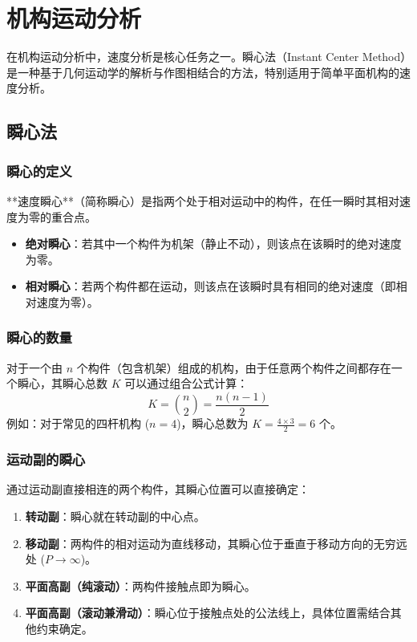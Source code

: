 \chapter{机构运动分析}
	
	在机构运动分析中，速度分析是核心任务之一。瞬心法（Instant Center Method）是一种基于几何运动学的解析与作图相结合的方法，特别适用于简单平面机构的速度分析。
	
	\section{瞬心法}
	
	\subsection{瞬心的定义}
	**速度瞬心**（简称瞬心）是指两个处于相对运动中的构件，在任一瞬时其相对速度为零的重合点。
	\begin{itemize}
		\item \textbf{绝对瞬心}：若其中一个构件为机架（静止不动），则该点在该瞬时的绝对速度为零。
		\item \textbf{相对瞬心}：若两个构件都在运动，则该点在该瞬时具有相同的绝对速度（即相对速度为零）。
	\end{itemize}
	
	\subsection{瞬心的数量}
	对于一个由 $n$ 个构件（包含机架）组成的机构，由于任意两个构件之间都存在一个瞬心，其瞬心总数 $K$ 可以通过组合公式计算：
	\begin{equation}
		K = \binom{n}{2} = \frac{n(n-1)}{2}
	\end{equation}
	例如：对于常见的四杆机构 ($n=4$)，瞬心总数为 $K = \frac{4 \times 3}{2} = 6$ 个。
	
	\subsection{运动副的瞬心}
	通过运动副直接相连的两个构件，其瞬心位置可以直接确定：
	\begin{enumerate}
		\item \textbf{转动副}：瞬心就在转动副的中心点。
		\item \textbf{移动副}：两构件的相对运动为直线移动，其瞬心位于垂直于移动方向的无穷远处 ($P \to \infty$)。
		\item \textbf{平面高副（纯滚动）}：两构件接触点即为瞬心。
		\item \textbf{平面高副（滚动兼滑动）}：瞬心位于接触点处的公法线上，具体位置需结合其他约束确定。
	\end{enumerate}
	
